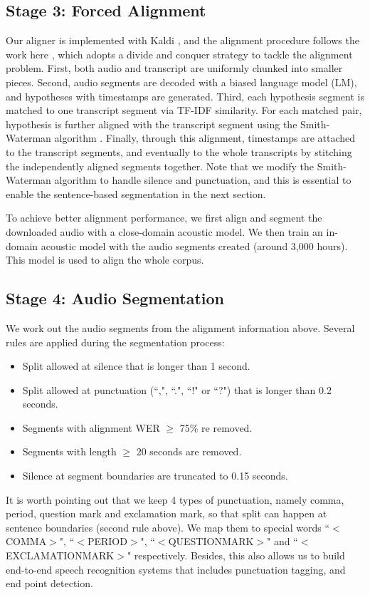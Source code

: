 \documentclass[a4paper]{article}
\begin{document}
\subsection{Stage 3: Forced Alignment}
Our aligner is implemented with Kaldi \cite{povey2011kaldi}, and the alignment
procedure follows the work here \cite{manohar2017jhu}, which adopts a divide and
conquer strategy to tackle the alignment problem. First, both audio and transcript
are uniformly chunked into smaller pieces. Second, audio segments are decoded with
a biased language model (LM), and hypotheses with timestamps are generated. Third, each hypothesis segment is matched to one transcript segment via TF-IDF similarity. For each matched pair, 
hypothesis is further aligned with the transcript segment using
the Smith-Waterman algorithm \cite{pearson1991searching}. Finally, through this alignment, timestamps are attached to the transcript segments,
and eventually to the whole transcripts by stitching the independently aligned segments together. Note that we modify the Smith-Waterman algorithm to handle silence and punctuation, and this is essential to enable the sentence-based segmentation in the next section.

To achieve better alignment performance, we first align and segment the
downloaded audio with a close-domain acoustic model. We then train an in-domain
acoustic model with the audio segments created (around 3,000 hours). This model
is used to align the whole corpus.

\subsection{Stage 4: Audio Segmentation}
We work out the audio segments from the alignment information above. Several
rules are applied during the segmentation process:
\begin{itemize}
  \item Split allowed at silence that is longer than 1 second.
  \item Split allowed at punctuation (``,", ``.", ``!" or ``?") that is
    longer than 0.2 seconds.
  \item Segments with alignment WER $\geq$ 75\% re removed.
  \item Segments with length $\geq$ 20 seconds are removed.
  \item Silence at segment boundaries are truncated to 0.15 seconds.
\end{itemize}

It is worth pointing out that we keep 4 types of punctuation, namely
comma, period, question mark and exclamation mark, so that split can happen at sentence boundaries (second rule above). We map them to special
words ``$<$COMMA$>$", ``$<$PERIOD$>$", ``$<$QUESTIONMARK$>$" and
``$<$EXCLAMATIONMARK$>$" respectively. Besides, this also allows us to build end-to-end
speech recognition systems that includes punctuation tagging, and end
point detection.
\end{document}

